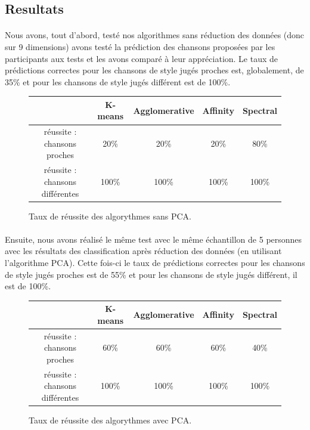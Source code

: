 \documentclass{ir}
\begin{document}
\subsection{Resultats}
\paragraph{}
Nous avons, tout d’abord, testé nos algorithmes sans réduction des données (donc sur 9 dimensions) avons testé 
la prédiction des chansons proposées par les participants aux tests et les avons comparé à leur appréciation. Le 
taux de prédictions correctes pour les chansons de style jugés proches est, globalement, de 35\% et pour les 
chansons de style jugés différent est de 100\%.


\begin{figure}[ht]
    \centering
    \begin{tabular}{ccccc}
        \phantom & K-means & Agglomerative & Affinity & Spectral\\
        \hline
        réussite : chansons proches & 20\%& 20\% & 20\% & 80\%\\
        réussite : chansons différentes & 100\% & 100\% & 100\% & 100\%\\
        \hline
    \end{tabular}
    \caption{Taux de réussite des algorythmes sans PCA.}
    \label{test}
\end{figure}

\paragraph{}
Ensuite, nous avons réalisé le même test avec le même échantillon de 5 personnes avec les résultats des 
classification après réduction des données (en utilisant l’algorithme PCA). Cette fois-ci le taux de prédictions 
correctes pour les chansons de style jugés proches est de 55\% et pour les chansons de style jugés différent, il 
est de 100\%.

\begin{figure}[ht]
    \centering
    \begin{tabular}{ccccc}
        \phantom & K-means & Agglomerative & Affinity & Spectral\\
        \hline
        réussite : chansons proches & 60\%& 60\% & 60\% & 40\%\\
        réussite : chansons différentes & 100\% & 100\% & 100\% & 100\%\\
        \hline
    \end{tabular}
    \caption{Taux de réussite des algorythmes avec PCA.}
    \label{test_pca}
\end{figure}
\end{document}
